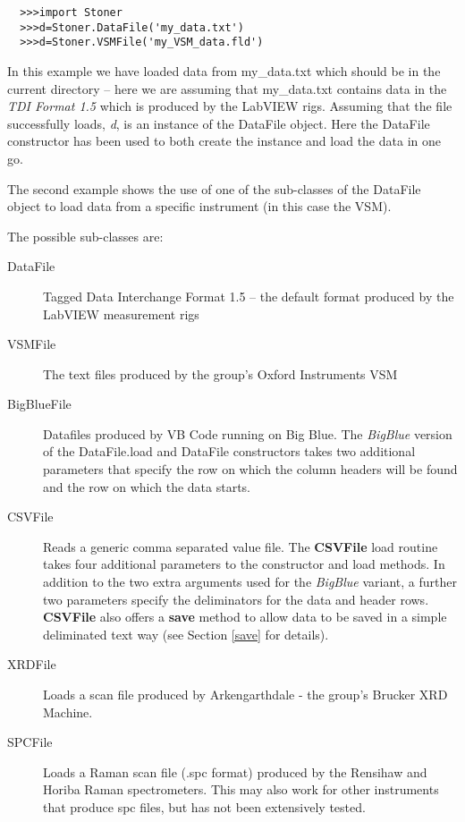 \documentclass[a4paper,11pt]{scrartcl}
\begin{document}
\begin{verbatim}
  >>>import Stoner
  >>>d=Stoner.DataFile('my_data.txt')
  >>>d=Stoner.VSMFile('my_VSM_data.fld')
\end{verbatim}

In this example we have loaded data from my\_data.txt which should be in the
current directory -- here we are assuming that my\_data.txt contains data in the
\textit{TDI Format 1.5} which is produced by the LabVIEW rigs. Assuming that the
file successfully loads, \textit{d}, is an instance of the DataFile object. Here
the DataFile constructor has been used to both create the instance and load the
data in one go.

The second example shows the use of one of the sub-classes of the DataFile object to load data from a specific instrument (in this case the VSM).


The possible sub-classes are:
\begin{description}
\item[DataFile] Tagged Data Interchange Format 1.5 -- the default format produced by
the LabVIEW measurement rigs
\item[VSMFile] The text files produced by the group's Oxford Instruments VSM
\item[BigBlueFile] Datafiles produced by VB Code running on Big Blue. The
\textit{BigBlue} version of the DataFile.load and DataFile constructors takes
two additional parameters that specify the row on which the column headers will
be found and the row on which the data starts.
\item[CSVFile] Reads a generic comma separated value file. The \textbf{CSVFile} load
routine takes four additional parameters to the constructor and load methods. In
addition to the two extra arguments used for the \textit{BigBlue} variant, a
further two parameters specify the deliminators for the data and header rows. \textbf{CSVFile} also offers a \textbf{save} method to allow data to be saved in a simple deliminated text way (see Section \ref{save} for details).
\item[XRDFile] Loads a scan file produced by Arkengarthdale - the group's Brucker
XRD Machine.
\item[SPCFile] Loads a Raman scan file (.spc format) produced by the Rensihaw and Horiba
Raman spectrometers. This may also work for other instruments that produce spc files, but has not been extensively tested.
\end{description}
\end{document}
